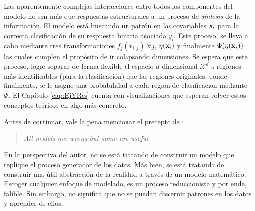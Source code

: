 \documentclass[../Main/Main.tex]{subfiles}
\begin{document}
Las aparentemente complejas interacciones entre todos los componentes del modelo no son más que respuestas estructurales a un proceso de \textit{síntesis} de la información. El modelo está buscando un patrón en las covariables $\mathbf{x}_i$ para la correcta clasificación de su respuesta binaria asociada $y_i$. Este proceso, se lleva a cabo mediante tres transformaciones $f_j(x_{i,j}) \; \forall j$, $\eta(\mathbf{x}_i)$ y finalmente $\Phi(\eta(\mathbf{x}_i))$ las cuales cumplen el propósito de ir colapsando dimensiones. Se espera que este proceso, logre separar de forma flexible el espacio $d$-dimensional $\mathcal{X}^d$ a regiones más identificables (para la clasificación) que las regiones originales; donde finalmente, se le asigne una probabilidad a cada región de clasificación mediante $\Phi$. El Capítulo \ref{cap:EjYRes} cuenta con visualizaciones que esperan volver estos conceptos teóricos en algo más concreto. 

Antes de continuar, vale la pena mencionar el precepto de \citet{box1976science}:
\begin{quote}
\textit{All models are wrong but some are useful}
\end{quote}
En la perspectiva del autor, no se está tratando de construir un modelo que replique el proceso generador de los datos. Más bien, se está tratando de construir una útil abstracción de la realidad a través de un modelo matemático. Escoger cualquier enfoque de modelado, es un proceso reduccionista y por ende, falible. Sin embargo, no significa que no se puedan discernir patrones en los datos y aprender de ellos. 
\end{document}
